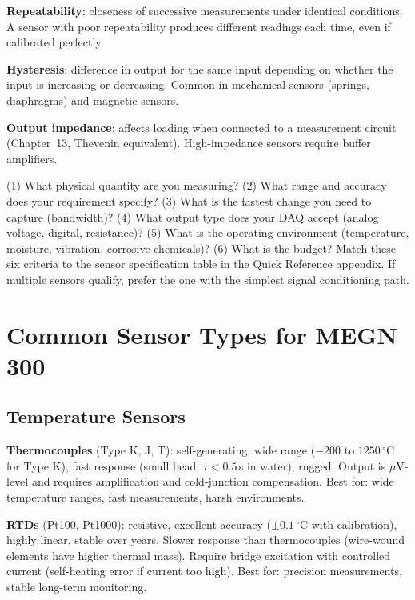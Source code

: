 \documentclass[11pt,letterpaper,twoside,openany]{book}
\newcommand{\degC}{\ensuremath{{}^{\circ}\text{C}}}
\begin{document}
\textbf{Repeatability}: closeness of successive measurements under identical conditions. A sensor with poor repeatability produces different readings each time, even if calibrated perfectly.

\textbf{Hysteresis}: difference in output for the same input depending on whether the input is increasing or decreasing. Common in mechanical sensors (springs, diaphragms) and magnetic sensors.

\textbf{Output impedance}: affects loading when connected to a measurement circuit (Chapter~13, Thevenin equivalent). High-impedance sensors require buffer amplifiers.

\begin{keyconceptbox}
(1) What physical quantity are you measuring? (2) What range and accuracy does your requirement specify? (3) What is the fastest change you need to capture (bandwidth)? (4) What output type does your DAQ accept (analog voltage, digital, resistance)? (5) What is the operating environment (temperature, moisture, vibration, corrosive chemicals)? (6) What is the budget? Match these six criteria to the sensor specification table in the Quick Reference appendix. If multiple sensors qualify, prefer the one with the simplest signal conditioning path.
\end{keyconceptbox}

\section{Common Sensor Types for MEGN 300}

\subsection{Temperature Sensors}
\textbf{Thermocouples} (Type K, J, T): self-generating, wide range ($-200$ to $1250$\,\degC{} for Type K), fast response (small bead: $\tau < 0.5$\,s in water), rugged. Output is $\mu$V-level and requires amplification and cold-junction compensation. Best for: wide temperature ranges, fast measurements, harsh environments.

\textbf{RTDs} (Pt100, Pt1000): resistive, excellent accuracy ($\pm 0.1$\,\degC{} with calibration), highly linear, stable over years. Slower response than thermocouples (wire-wound elements have higher thermal mass). Require bridge excitation with controlled current (self-heating error if current too high). Best for: precision measurements, stable long-term monitoring.
\end{document}
